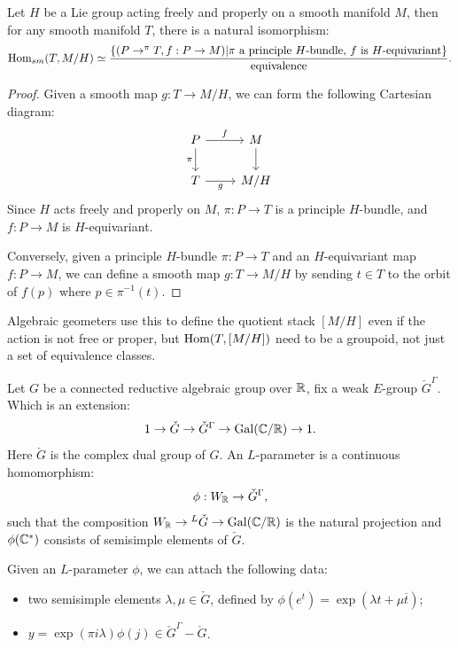 
\begin{lem}
  Let $H$ be a Lie group acting freely and properly on a smooth manifold $M$, then for any smooth manifold $T$, there is a natural isomorphism:
  \[\operatorname{Hom}_{sm}(T,M/H) \simeq \frac{\{( P \to^\pi T,f: P \to M)|\textrm{$\pi$ a principle $H$-bundle, $f$ is $H$-equivariant}\}}{\textrm{equivalence}}.\]
\end{lem}

\begin{proof}
  Given a smooth map $g : T \to M/H$, we can form the following Cartesian diagram:
  \[
  \begin{tikzcd}
    P \arrow[r,"f"] \arrow[d,"\pi"'] & M \arrow[d] \\
    T \arrow[r,"g"'] & M/H
  \end{tikzcd}
  \]
  Since $H$ acts freely and properly on $M$, $\pi : P \to T$ is a principle $H$-bundle, and $f : P \to M$ is $H$-equivariant.

  Conversely, given a principle $H$-bundle $\pi : P \to T$ and an $H$-equivariant map $f : P \to M$, we can define a smooth map $g : T \to M/H$ by sending $t \in T$ to the orbit of $f(p)$ where $p \in \pi^{-1}(t)$.
\end{proof}

\begin{rk}
  Algebraic geometers use this to define the quotient stack $[M/H]$ even if the action is not free or proper, but $\operatorname{Hom}(T,[M/H])$ need to be a groupoid, not just a set of equivalence classes.
\end{rk}





Let $G$ be a connected reductive algebraic group over $\mathbb{R}$, fix a weak $E$-group $\check{G}^{\Gamma}$. Which is an extension:
\[1 \to \check{G} \to {\check{G}^{\Gamma}} \to \mathrm{Gal}(\mathbb{C}/\mathbb{R}) \to 1.\]
Here $\check{G}$ is the complex dual group of $G$.
An $L$-parameter is a continuous homomorphism:
\[\phi : W_{\mathbb{R}} \to {\check{G}^{\Gamma}},\]
such that the composition $W_{\mathbb{R}} \to {^{L}\check{G}} \to \mathrm{Gal}(\mathbb{C}/\mathbb{R})$ is the natural projection and $\phi(\mathbb{C}^*)$ consists of semisimple elements of $\check{G}$.

Given an $L$-parameter $\phi$, we can attach the following data:
\begin{itemize}
  \item two semisimple elements $\lambda,  \mu \in \check{G}$, defined by $\phi(e^t) = \exp(\lambda t + \mu \overline{t})$;
  \item $y = \exp(\pi i \lambda)\phi(j) \in \check{G}^{\Gamma} - \check{G}$.
\end{itemize}

